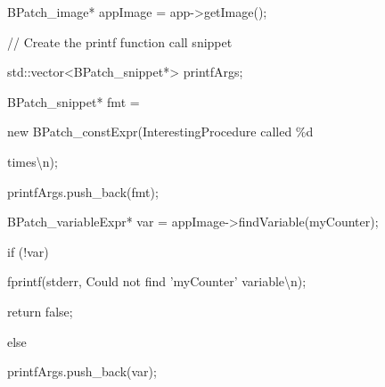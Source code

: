 {{{{{{{{

BPatch_image* appImage = app->getImage();}





\bigskip



{

// Create the printf function call snippet}



{

std::vector<BPatch_snippet*> printfArgs;}



{

BPatch_snippet* fmt =



{

new BPatch_constExpr({\textquotedbl}InterestingProcedure called \%d

times{\textbackslash}n{\textquotedbl});}



{

printfArgs.push_back(fmt);}





\bigskip



{

BPatch_variableExpr* var = appImage->findVariable({\textquotedbl}myCounter{\textquotedbl});}



{

if (!var) {}



{

fprintf(stderr, {\textquotedbl}Could not find 'myCounter' variable{\textbackslash}n{\textquotedbl});}



{

return false;}



{

} else {}



{

printfArgs.push_back(var);}



{

}}





\bigskip



}}}}}}}}
